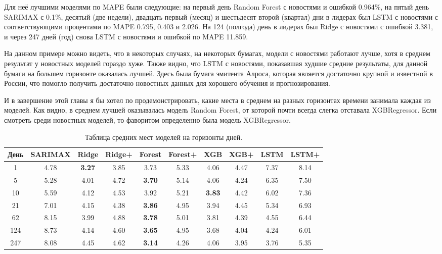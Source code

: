 \documentclass[12pt, a4paper]{article}
\begin{document}
Для неё лучшими моделями по MAPE были следующие: на первый день Random Forest с новостями и ошибкой 0.964\%, на пятый день SARIMAX с 0.1\%, десятый (две недели), двадцать первый (месяц) и шестьдесят второй (квартал) дни в лидерах был LSTM с новостями с соответствующими процентами по MAPE 0.795, 0.403 и 2.026. На 124 (полгода) день в лидерах был Ridge с новостями с ошибкой 3.381, и через 247 дней (год) снова LSTM с новостями и ошибкой по MAPE 11.859.

На данном примере можно видеть, что в некоторых случаях, на некоторых бумагах, модели с новостями работают лучше, хотя в среднем результат у новостных моделей гораздо хуже. Также видно, что LSTM с новостями, показавшая худшие средние результаты, для данной бумаги на большем горизонте оказалась лучшей. Здесь была бумага эмитента Алроса, которая является достаточно крупной и известной в России, что помогло получить достаточно новостных данных для хорошего обучения и прогнозирования.

И в завершение этой главы я бы хотел по  продемонстрировать, какие места в среднем на разных горизонтах времени занимала каждая из моделей. Как видно, в среднем лучшей оказывалась модель Random Forest, от которой почти всегда слегка отставала XGBRegressor. Если смотреть среди новостных моделей, то фаворитом определенно была модель XGBRegressor. 
\begin{table}[H]
\centering
\caption{Таблица средних мест моделей на горизонты дней.}
\begin{tabular}{ |c|c|c|c|c|c|c|c|c|c| } 
 \hline
День & SARIMAX & Ridge & Ridge+ & Forest & Forest+ & XGB & XGB+ & LSTM & LSTM+ \\ 
 \hline
1 & 4.78 & \textbf{3.27} & 3.85 & 3.73 & 5.33 & 4.06 & 4.47 & 7.37 & 8.14 \\ 
 \hline
5 & 5.28 & 4.01 & 4.72 & \textbf{3.70} & 5.14 & 4.06 & 4.24 & 6.35 & 7.50 \\
 \hline
10 & 5.59 & 4.12 & 4.53 & 3.92 & 5.21 & \textbf{3.83} & 4.42 & 6.02 & 7.36 \\
 \hline
21 & 7.01 & 4.15 & 4.38 & \textbf{3.86} & 4.95 & 3.94 & 4.45 & 5.34 & 6.93 \\
 \hline
62 & 8.15 & 3.99 & 4.88 & \textbf{3.78} & 5.01 & 3.81 & 4.39 & 4.55 & 6.44 \\
 \hline
124 & 8.73 & 4.14 & 4.60 & \textbf{3.65} & 4.95 & 3.68 & 4.04 & 4.24 & 6.01 \\
 \hline
247 & 8.08 & 4.45 & 4.62 & \textbf{3.14} & 4.26 & 4.06 & 3.95 & 3.76 & 5.35 \\
 \hline
\end{tabular}
\label{tab:mean_results}
\end{table}
\end{document}
